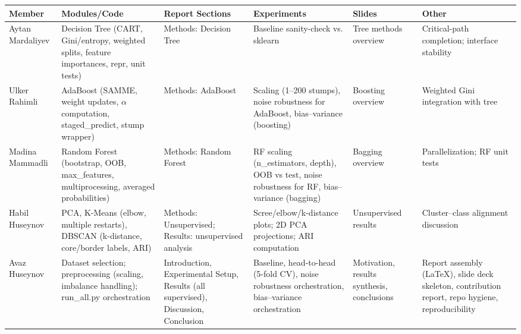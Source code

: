 \documentclass[11pt,a4paper]{article}
\begin{document}
\begin{table}[h]
\centering
\small
\begin{tabular}{>{\raggedright\arraybackslash}p{2.5cm}
                >{\raggedright\arraybackslash}p{3.0cm}
                >{\raggedright\arraybackslash}p{2.5cm}
                >{\raggedright\arraybackslash}p{2.2cm}
                >{\raggedright\arraybackslash}p{2.2cm}
                >{\raggedright\arraybackslash}p{2.2cm}}
\toprule
\textbf{Member} &
\textbf{Modules/Code} &
\textbf{Report Sections} &
\textbf{Experiments} &
\textbf{Slides} &
\textbf{Other} \\
\midrule
Aytan Mardaliyev &
Decision Tree (CART, Gini/entropy, weighted splits, feature importances, repr, unit tests) &
Methods: Decision Tree &
Baseline sanity-check vs. sklearn &
Tree methods overview &
Critical-path completion; interface stability \\
\midrule
Ulker Rahimli &
AdaBoost (SAMME, weight updates, $\alpha$ computation, staged\_predict, stump wrapper) &
Methods: AdaBoost &
Scaling (1–200 stumps), noise robustness for AdaBoost, bias–variance (boosting) &
Boosting overview &
Weighted Gini integration with tree \\
\midrule
Madina Mammadli &
Random Forest (bootstrap, OOB, max\_features, multiprocessing, averaged probabilities) &
Methods: Random Forest &
RF scaling (n\_estimators, depth), OOB vs test, noise robustness for RF, bias–variance (bagging) &
Bagging overview &
Parallelization; RF unit tests \\
\midrule
Habil Huseynov &
PCA, K-Means (elbow, multiple restarts), DBSCAN (k-distance, core/border labels, ARI) &
Methods: Unsupervised; Results: unsupervised analysis &
Scree/elbow/k-distance plots; 2D PCA projections; ARI computation &
Unsupervised results &
Cluster–class alignment discussion \\
\midrule
Avaz Huseynov &
Dataset selection; preprocessing (scaling, imbalance handling); run\_all.py orchestration &
Introduction, Experimental Setup, Results (all supervised), Discussion, Conclusion &
Baseline, head-to-head (5-fold CV), noise robustness orchestration, bias–variance orchestration &
Motivation, results synthesis, conclusions &
Report assembly (LaTeX), slide deck skeleton, contribution report, repo hygiene, reproducibility \\
\bottomrule
\end{tabular}
\end{table}

\vspace{1em}
\end{document}

